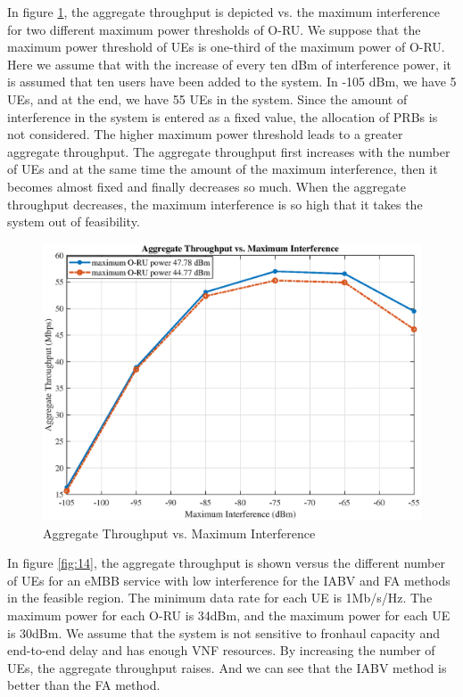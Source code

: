 \documentclass[conference]{IEEEtran}
\begin{document}
In figure \ref{fig:13}, the aggregate throughput is depicted vs. the maximum interference for two different maximum power thresholds of O-RU. We suppose that the maximum power threshold of UEs is one-third of the maximum power of O-RU.
Here we assume that with the increase of every ten dBm of interference power, it is assumed that ten users have been added to the system. In -105 dBm, we have 5 UEs, and at the end, we have 55 UEs in the system.
Since the amount of interference in the system is entered as a fixed value,
the allocation of PRBs is not considered.
The higher maximum power threshold leads to a greater aggregate throughput. 
The aggregate throughput first increases with the number of UEs and at the same time the amount of the maximum interference, then it becomes almost fixed and finally decreases so much. When the aggregate throughput decreases, the maximum interference is so high that it takes the system out of feasibility.

\begin{figure}
  \centering 
    \includegraphics[scale = 0.4]{interF_new.eps}
  \caption{Aggregate Throughput vs. Maximum Interference }
  \label{fig:13}
\end{figure}

In figure \ref{fig:14}, the aggregate throughput is shown versus
the different number of UEs for an eMBB service with low interference for the IABV and FA methods in the feasible region.
The minimum data rate for each UE is 1Mb/s/Hz.
The maximum power for each O-RU is 34dBm, and the maximum power for each UE is 30dBm. We assume that the system is not sensitive to fronhaul capacity and end-to-end delay and has enough VNF resources.
By increasing the number of UEs, the aggregate throughput raises.
And we can see that the IABV method is better than the FA method. 
\end{document}
